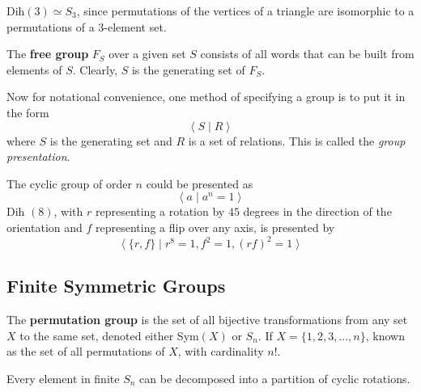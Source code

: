   \begin{example}
    Dih$(3) \simeq S_{3}$, since permutations of the vertices of a triangle are isomorphic to a permutations of a 3-element set. 
  \end{example}

  \begin{definition}
    The \textbf{free group} $F_{S}$ over a given set $S$ consists of all words that can be built from elements of $S$. Clearly, $S$ is the generating set of $F_{S}$. 
  \end{definition}

  Now for notational convenience, one method of specifying a group is to put it in the form
  \begin{equation}
    \big\langle \; S \; | \; R \;\big\rangle
  \end{equation}
  where $S$ is the generating set and $R$ is a set of relations. This is called the \textit{group presentation}. 

  \begin{example}
    The cyclic group of order $n$ could be presented as
    \begin{equation}
      \big\langle \; a \; | \; a^{n} = 1 \;\big\rangle
    \end{equation}
    Dih $(8)$, with $r$ representing a rotation by $45$ degrees in the direction of the orientation and $f$ representing a flip over any axis, is presented by
    \begin{equation}
      \big\langle \; \{ r, f\} \; | \; r^{8} = 1, f^{2} = 1, (r f)^{2} = 1 \;\big\rangle
    \end{equation}
  \end{example}

\subsection{Finite Symmetric Groups}

  \begin{definition}
    The \textbf{permutation group} is the set of all bijective transformations from any set $X$ to the same set, denoted either Sym$(X)$ or $S_n$. If $X = \{1, 2, 3 ,... , n\}$, known as the set of all permutations of $X$, with cardinality $n!$. 
  \end{definition}

  \begin{proposition}
    Every element in finite $S_{n}$ can be decomposed into a partition of cyclic rotations.
  \end{proposition}

